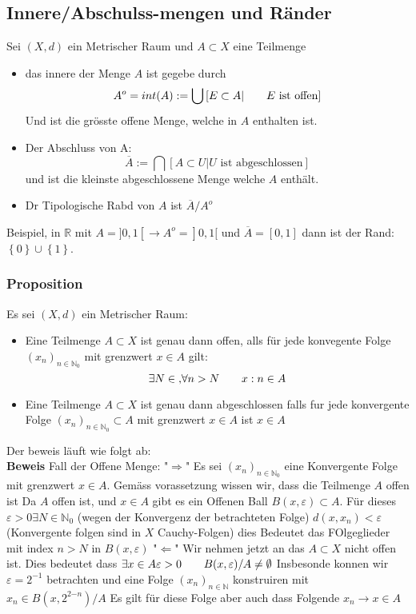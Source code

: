 \documentclass{article}
\newcommand{\mspc}{\hspace{0.7cm}}
\newcommand{\beweis}{\\\textbf{Beweis }}
\newcommand{\proposition}[1]{\subsubsection*{Proposition {#1}}}
\begin{document}
\subsection{Innere/Abschulss-mengen und Ränder}
Sei $(X,d)$ ein Metrischer Raum und $A\subset X$ eine Teilmenge
\begin{itemize}
\item{das innere der Menge $A$ ist gegebe durch \[A^o=int(A):=\bigcup\left[E\subset A|\mspc E \text{ ist offen}\right]\] Und ist die grösste offene Menge, welche in $A$ enthalten ist.}
\item{Der Abschluss von A:\[\overline{A}
:=\bigcap \left[A\subset U|U \text{ ist abgeschlossen}\right]\] und ist die kleinste abgeschlossene Menge welche $A$ enthält.}
\item{Dr Tipologische Rabd von $A$ ist $\overline{A}/A^o$}
\end{itemize}
Beispiel, in $\mathbb{R}$ mit $A=]0,1[\rightarrow A^o=]0,1[$ und $\overline{A}=[0,1]$ dann ist der Rand: $\left\lbrace 0\right\rbrace\cup\left\lbrace1\right\rbrace$.
\proposition{} Es sei $(X,d)$ ein Metrischer Raum:
\begin{itemize}
\item{Eine Teilmenge $A\subset X$ ist genau dann offen, alls für jede konvegente Folge $(x_n)_{n\in\mathbb{N}_0}$ mit grenzwert $x\in A$ gilt:\[\exists N\in\mathbb, \forall n>N \mspc x:n\in A\]}
\item{Eine Teilmenge $A\subset X$ ist genau dann abgeschlossen falls fur jede konvergente Folge $(x_n)_{n\in\mathbb{N}_0}\subset A$ mit grenzwert $x\in A$ ist $x\in A$}
\end{itemize}
Der beweis läuft wie folgt ab:
\beweis Fall der Offene Menge:
"$\Rightarrow$" Es sei $(x_n)_{n\in\mathbb{N}_0 }$ eine Konvergente Folge mit grenzwert $x\in A$. Gemäss vorassetzung wissen wir, dass die Teilmenge $A$ offen ist Da $A$ offen ist, und $x\in A$ gibt es ein Offenen Ball $B(x,\varepsilon)\subset A$. Für dieses $\varepsilon>0 \exists N\in\mathbb{N}_0$ (wegen der Konvergenz der betrachteten Folge) $d(x,x_n)<\varepsilon$ (Konvergente folgen sind in $X$ Cauchy-Folgen) dies Bedeutet das FOlgeglieder 
mit index $n>N$ in $B(x,\varepsilon)$\newline
"$\Leftarrow$" Wir nehmen jetzt an das $A\subset X$ nicht offen ist. Dies bedeutet dass $\exists x\in A \varepsilon>0 \mspc B(x,\varepsilon)/A\neq\emptyset$
Insbesonde konnen wir $\varepsilon=2^{-1}$ betrachten und eine Folge $(x_n)_{n\in\mathbb{N}}$ konstruiren mit $x_n\in B(x,2^{2{-n}})/A$ Es gilt für diese Folge aber auch dass Folgende $x_n\rightarrow x\in A$ \newline
\end{document}
